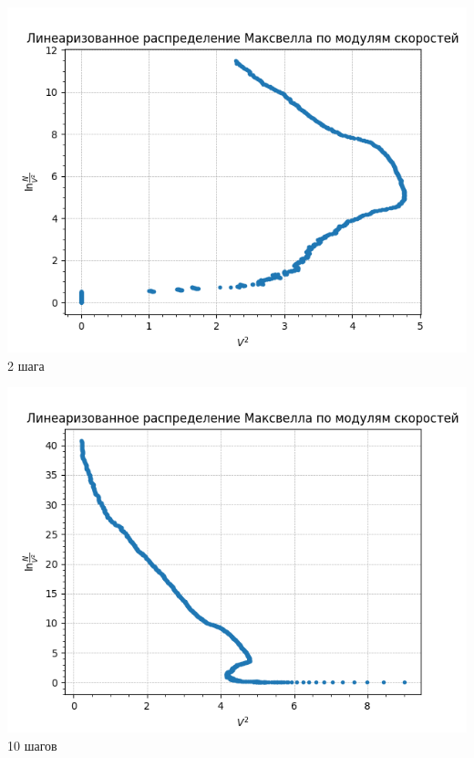 \begin{minipage}{0.47\textwidth}
    \begin{center}
        \includegraphics[width=\linewidth]{1.png}\\
        2 шага
    \end{center}
   
\end{minipage}
\begin{minipage}{0.47\textwidth}
    \begin{center}
        \includegraphics[width=\linewidth]{10.png}\\
        10 шагов
    \end{center}
\end{minipage}

